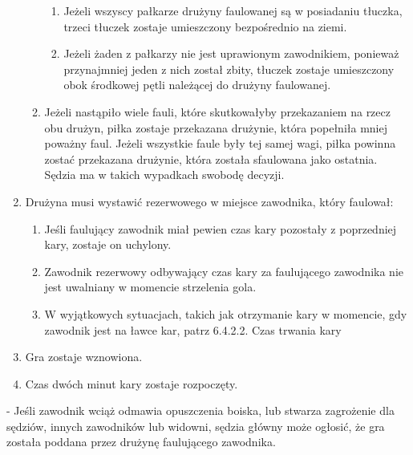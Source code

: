 \documentclass[12pt]{article}
\newcommand\other{\bgroup\color{green}\markoverwith{\textcolor{green}{\rule[-0.5ex]{2pt}{0.4pt}}}\ULon}
\begin{document}
\begin{enumerate}
\begin{enumerate}
		            \begin{enumerate}
			            \item
			                  Jeżeli wszyscy pałkarze drużyny faulowanej są w posiadaniu
			                  tłuczka, trzeci tłuczek zostaje umieszczony bezpośrednio na ziemi.
			            \item
			                  Jeżeli żaden z pałkarzy nie jest uprawionym zawodnikiem, ponieważ
			                  przynajmniej jeden z nich został zbity, tłuczek zostaje
			                  umieszczony obok środkowej pętli należącej do drużyny faulowanej.
		            \end{enumerate}
		      \item
		            Jeżeli nastąpiło wiele fauli, które skutkowałyby przekazaniem na
		            rzecz obu drużyn, piłka zostaje przekazana drużynie, która popełniła
		            mniej poważny faul. Jeżeli wszystkie faule były tej samej wagi,
		            piłka powinna zostać przekazana drużynie, która została sfaulowana
		            jako ostatnia. Sędzia ma w takich wypadkach swobodę decyzji.
	      \end{enumerate}
	\item
	      Drużyna musi wystawić rezerwowego w miejsce zawodnika, który faulował:

	      \begin{enumerate}
		      \item
		            Jeśli faulujący zawodnik miał pewien czas kary pozostały z
		            poprzedniej kary, zostaje on uchylony.
		      \item
		            Zawodnik rezerwowy odbywający czas kary za faulującego zawodnika nie
		            jest uwalniany w momencie strzelenia gola.
		      \item
		            W wyjątkowych sytuacjach, takich jak otrzymanie kary w momencie, gdy
		            zawodnik jest na ławce kar, patrz 6.4.2.2. Czas trwania kary
	      \end{enumerate}
	\item
	      Gra zostaje wznowiona.
	\item
	      Czas dwóch minut kary zostaje rozpoczęty.
\end{enumerate}

\other{Poddanie meczu} - Jeśli zawodnik wciąż odmawia opuszczenia boiska,
lub stwarza zagrożenie dla sędziów, innych zawodników lub widowni,
sędzia główny może ogłosić, że gra została poddana przez drużynę
faulującego zawodnika.
\end{document}

